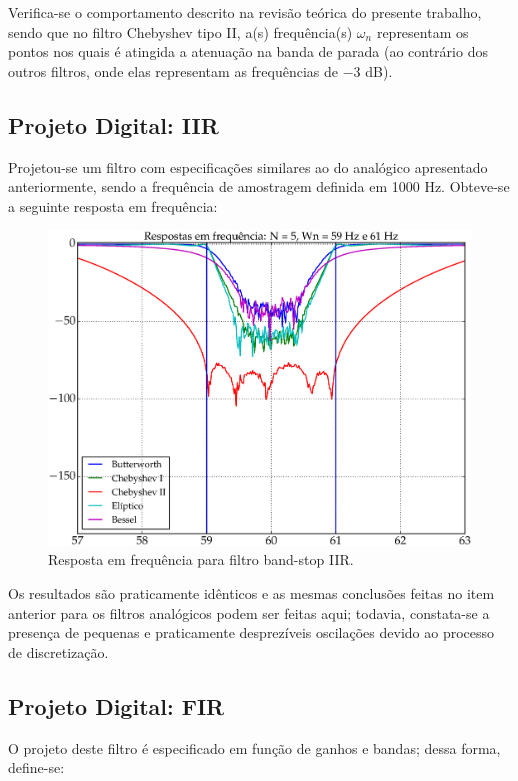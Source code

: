 Verifica-se o comportamento descrito na revisão teórica do presente trabalho, sendo que no filtro Chebyshev tipo II, a(s) frequência(s) $\omega_n$ representam os pontos nos quais é atingida a atenuação na banda de parada (ao contrário dos outros filtros, onde elas representam as frequências de $-3$ dB).

\subsection{Projeto Digital: IIR}
Projetou-se um filtro com especificações similares ao do analógico apresentado anteriormente, sendo a frequência de amostragem definida em 1000 Hz. Obteve-se a seguinte resposta em frequência:

\begin{figure}[H]
  \centering
  \includegraphics[scale=0.55]{images/plots/bandstop_IIR}
  \caption{Resposta em frequência para filtro band-stop IIR.}
  \label{fig:bandstop_IIR_response}
\end{figure}

Os resultados são praticamente idênticos e as mesmas conclusões feitas no item anterior para os filtros analógicos podem ser feitas aqui; todavia, constata-se a presença de pequenas e praticamente desprezíveis oscilações devido ao processo de discretização.

\newpage
\subsection{Projeto Digital: FIR}
O projeto deste filtro é especificado em função de ganhos e bandas; dessa forma, define-se:

